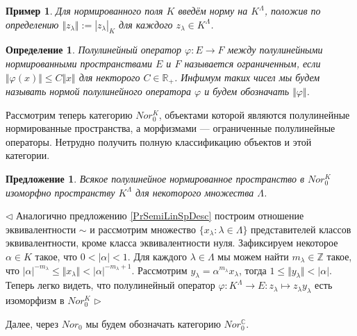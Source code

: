 \documentclass[12pt]{article}
\newtheorem{proposition}[theorem]{Предложение}
\newtheorem{definition}[theorem]{Определение}
\newtheorem{example}[theorem]{Пример}
\newenvironment{proof}{\par $\triangleleft$}{$\triangleright$}
\begin{document}
\begin{example}\label{ExSemiLinNorModelSp}
Для нормированного поля $K$ введём норму на $K^{\Lambda}$, положив по определению $\Vert z_\lambda\Vert:=|z_\lambda|_K$ для каждого $z_\lambda\in K^\Lambda$. 
\end{example}

\begin{definition}\label{DefSemiLinBndOp} Полулинейный оператор $\varphi : E \to F$ между полулинейными нормированными пространствами $E$ и $F$ называется ограниченным, если $\Vert \varphi (x)\Vert \leq C \Vert x \Vert$ для некторого $C\in\mathbb{R}_+$. Инфимум таких чисел мы будем называть нормой полулинейного оператора $\varphi$ и будем обозначать $\Vert\varphi\Vert$.
\end{definition}

Рассмотрим теперь категорию $Nor_0^K$, объектами которой являются полулинейные  нормированные пространства, а морфизмами --- ограниченные полулинейные операторы. Нетрудно получить полную классификацию объектов и этой категории.

\begin{proposition}\label{PrSemiLinNorSpDesc} Всякое полулинейное нормированное пространство в $Nor_0^K$ изоморфно пространству $K^{\Lambda}$ для некоторого множества $\Lambda$.
\end{proposition}

\begin{proof} Аналогично предложению \ref{PrSemiLinSpDesc} построим отношение эквивалентности $\sim$ и рассмотрим множество $\{x_\lambda:\lambda\in\Lambda\}$ представителей классов эквивалентности, кроме класса эквивалентности нуля. Зафиксируем некоторое $\alpha\in K$ такое, что $0<|\alpha|<1$. Для каждого $\lambda\in\Lambda$ мы можем найти $m_\lambda\in\mathbb{Z}$ такое, что $|\alpha|^{-m_\lambda}\leq\Vert x_\lambda\Vert< |\alpha|^{-m_\lambda+1}$. Рассмотрим $y_\lambda=\alpha^{m_\lambda} x_\lambda$, тогда $1\leq \Vert y_\lambda\Vert<|\alpha|$. Теперь легко видеть, что полулинейный оператор $\varphi: K^\Lambda\to E: z_\lambda\mapsto z_\lambda y_\lambda$ есть изоморфизм в $Nor_0^K$
\end{proof}

Далее, через $Nor_0$ мы будем обозначать категорию $Nor_0^\mathbb{C}$.
\end{document}
